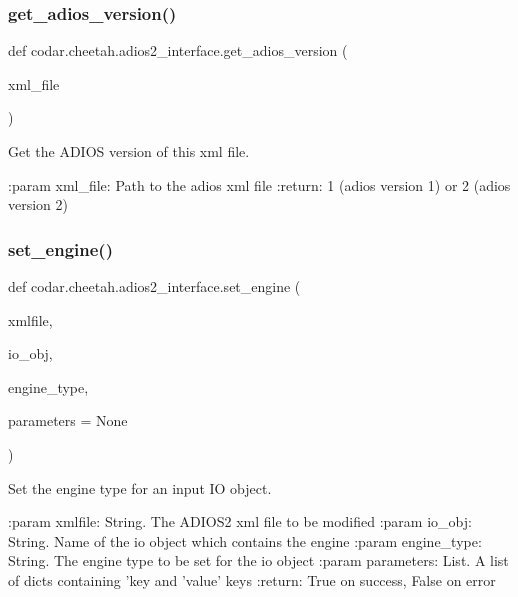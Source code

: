 \subsubsection{\texorpdfstring{get\+\_\+adios\+\_\+version()}{get\_adios\_version()}}
{\footnotesize\ttfamily def codar.\+cheetah.\+adios2\+\_\+interface.\+get\+\_\+adios\+\_\+version (\begin{DoxyParamCaption}\item[{}]{xml\+\_\+file }\end{DoxyParamCaption})}

\begin{DoxyVerb}Get the ADIOS version of this xml file.

:param xml_file: Path to the adios xml file
:return: 1 (adios version 1) or 2 (adios version 2)
\end{DoxyVerb}
 \mbox{\label{namespacecodar_1_1cheetah_1_1adios2__interface_ac7a185c06b845d8a964ef05d380d9406}} 
\subsubsection{\texorpdfstring{set\+\_\+engine()}{set\_engine()}}
{\footnotesize\ttfamily def codar.\+cheetah.\+adios2\+\_\+interface.\+set\+\_\+engine (\begin{DoxyParamCaption}\item[{}]{xmlfile,  }\item[{}]{io\+\_\+obj,  }\item[{}]{engine\+\_\+type,  }\item[{}]{parameters = {\ttfamily None} }\end{DoxyParamCaption})}

\begin{DoxyVerb}Set the engine type for an input IO object.

:param xmlfile: String. The ADIOS2 xml file to be modified
:param io_obj: String. Name of the io object which contains the engine
:param engine_type: String. The engine type to be set for the io object
:param parameters: List. A list of dicts containing 'key and 'value' keys
:return: True on success, False on error
\end{DoxyVerb}
 \mbox{\label{namespacecodar_1_1cheetah_1_1adios2__interface_a280110df154228afd07dcb5c5a4a72d4}} 

